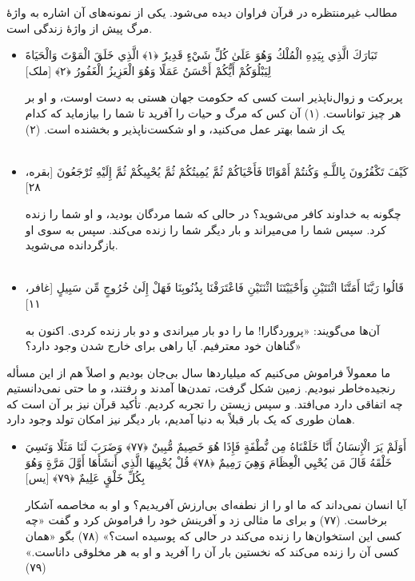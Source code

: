 مطالب غیرمنتظره در قرآن فراوان دیده می‌شود. یکی از نمونه‌های آن اشاره به واژهٔ مرگ پیش از واژهٔ زندگی است.
\begin{itemize}
	\item[]
	{
		تَبَارَكَ الَّذِي بِيَدِهِ الْمُلْكُ وَهُوَ عَلَىٰ كُلِّ شَيْءٍ قَدِيرٌ ﴿١﴾ الَّذِي خَلَقَ الْمَوْتَ وَالْحَيَاةَ لِيَبْلُوَكُمْ أَيُّكُمْ أَحْسَنُ عَمَلًا  وَهُوَ الْعَزِيزُ الْغَفُورُ ﴿٢﴾ [ملک]}
	
	{
		پربرکت و زوال‌ناپذیر است کسی که حکومت جهان هستی به دست اوست، و او بر هر چیز تواناست. (۱) آن کس که مرگ و حیات را آفرید تا شما را بیازماید که کدام یک از شما بهتر عمل می‌کنید، و او شکست‌ناپذیر و بخشنده است. (۲) 
	}
	~\\~
	\item []
	{
		
		كَيْفَ تَكْفُرُونَ بِاللَّـهِ وَكُنتُمْ أَمْوَاتًا فَأَحْيَاكُمْ ثُمَّ يُمِيتُكُمْ ثُمَّ يُحْيِيكُمْ ثُمَّ إِلَيْهِ تُرْجَعُونَ [بقره، ۲۸]}
	
	{
		چگونه به خداوند کافر می‌شوید؟ در حالی که شما مردگان بودید، و او شما را زنده کرد. سپس شما را می‌میراند و بار دیگر شما را زنده می‌کند. سپس به سوی او بازگردانده می‌شوید. 
	}
	~\\~
	\item []
	{
		قَالُوا رَبَّنَا أَمَتَّنَا اثْنَتَيْنِ وَأَحْيَيْتَنَا اثْنَتَيْنِ فَاعْتَرَفْنَا بِذُنُوبِنَا فَهَلْ إِلَىٰ خُرُوجٍ مِّن سَبِيلٍ [غافر، ۱۱]}
	
	{
		آن‌ها می‌گویند: «پروردگارا! ما را دو بار میراندی و دو بار زنده کردی. اکنون به گناهان خود معترفیم. آیا راهی برای خارج شدن وجود دارد؟» 
	}
	
\end{itemize}

ما معمولاً فراموش می‌کنیم که میلیاردها سال بی‌جان بودیم و اصلاً هم از این مسأله رنجیده‌خاطر نبودیم. زمین شکل گرفت، تمدن‌ها آمدند و رفتند، و ما حتی نمی‌دانستیم چه اتفاقی دارد می‌افتد. و سپس زیستن را تجربه کردیم. تأکید قرآن نیز بر آن است که همان طوری که یک بار قبلاً به دنیا آمدیم، بار دیگر نیز امکان تولد وجود دارد. 

\begin{itemize}
	\item[]
	
	{
		أَوَلَمْ يَرَ الْإِنسَانُ أَنَّا خَلَقْنَاهُ مِن نُّطْفَةٍ فَإِذَا هُوَ خَصِيمٌ مُّبِينٌ ﴿٧٧﴾ وَضَرَبَ لَنَا مَثَلًا وَنَسِيَ خَلْقَهُ قَالَ مَن يُحْيِي الْعِظَامَ وَهِيَ رَمِيمٌ ﴿٧٨﴾ قُلْ يُحْيِيهَا الَّذِي أَنشَأَهَا أَوَّلَ مَرَّةٍ وَهُوَ بِكُلِّ خَلْقٍ عَلِيمٌ ﴿٧٩﴾ [یس]
	}
	
	{
		آیا انسان نمی‌داند که ما او را از نطفه‌ای بی‌ارزش آفریدیم؟ و او به مخاصمه آشکار برخاست. (۷۷) و برای ما مثالی زد و آفرینش خود را فراموش کرد و گفت «چه کسی این استخوان‌ها را زنده می‌کند در حالی که پوسیده است؟» (۷۸) بگو «همان کسی آن را زنده می‌کند که نخستین بار آن را آفرید و او به هر مخلوقی داناست.» (۷۹)}
\end{itemize}

